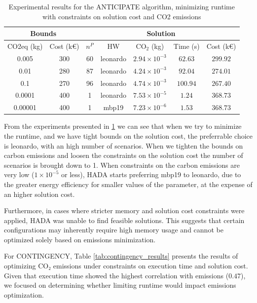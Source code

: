 \documentclass[a4paper,singleside,12pt]{report} %
\begin{document}
\begin{table}[h!]
    \centering
    \begin{tabular}{|cc|ccccc|}
        \hline
        \multicolumn{2}{|c|}{Bounds} & \multicolumn{5}{c|}{Solution} \\
        \hline
        CO2eq (kg) & Cost (k€) & $n^P$ & HW & CO$_2$ (kg) & Time (s) & Cost (k€) \\
        \hline
        0.005 & 300 & 60 & leonardo & $2.94 \times 10^{-3}$ & $62.63$ & $299.92$ \\
        0.01 & 280 & 87 & leonardo & $4.24 \times 10^{-3}$ & $92.04$ & $274.01$ \\
        0.1 & 270 & 96 & leonardo & $4.74 \times 10^{-3}$ & $100.94$ & $267.40$ \\
        0.0001 & 400 & 1 & leonardo & $7.53 \times 10^{-5}$ & $1.24$ & $368.73$ \\
        0.00001 & 400 & 1 & mbp19 & $7.23 \times 10^{-6}$ & $1.53$ & $368.73$ \\
        \hline
    \end{tabular}
    \caption{Experimental results for the ANTICIPATE algorithm, minimizing runtime with constraints on solution cost and CO2 emissions}
    \label{tab:anticipate_results_runtime}
\end{table}

From the experiments presented in \ref{tab:anticipate_results_runtime} we can see that when we try to minimize the runtime, and we have tight bounds on the solution cost, the preferrable choice 
is leonardo, with an high number of scenarios. When we tighten the bounds on carbon emissions and loosen the constraints on the solution cost the number of scenarios is brought down to 1. When
constraints on the carbon emissions are very low ($ 1 \times 10 ^ {-5}$ or less), HADA starts preferring mbp19 to leonardo, due to the greater energy efficiency for smaller values of the parameter,
at the expense of an higher solution cost.

Furthermore, in cases where stricter memory and solution cost constraints were applied, HADA was unable to find feasible solutions. This suggests that certain configurations may inherently 
require high memory usage and cannot be optimized solely based on emissions minimization.

For CONTINGENCY, Table \ref{tab:contingency_results} presents the results of optimizing CO₂ emissions under constraints on execution time and solution cost. Given that execution time 
showed the highest correlation with emissions ($0.47$), we focused on determining whether limiting runtime would impact emissions optimization.
\end{document}

